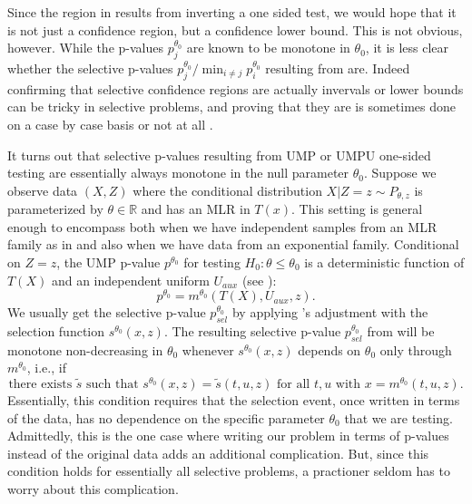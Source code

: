\documentclass{article}
\newcommand{\R}{\mathbb{R}}
\begin{document}
Since the region in  results from inverting a one sided test, we would hope that it is not just a confidence region, but a confidence lower bound. This is not obvious, however. While the p-values $p^{\theta_0}_j$ are known to be monotone in $\theta_0$, it is less clear whether the selective p-values $p^{\theta_0}_{j}/ \min_{i \neq j} p^{\theta_0}_i$ resulting from  are. Indeed confirming that selective confidence regions are actually invervals or lower bounds can be tricky in selective problems, and proving that they are is sometimes done on a case by case basis \citep{Benjamini, Lee} or not at all \citep{Sengupta}. 

It turns out that selective p-values resulting from UMP or UMPU one-sided testing are essentially always monotone in the null parameter $\theta_0$. Suppose we observe data $(X, Z)$ where the conditional distribution $X | Z= z \sim P_{\theta, z}$ is parameterized by $\theta \in \R$ and has an MLR in $T(x)$. This setting is general enough to encompass both when we have independent samples from an MLR family as in  and also when we have data from an exponential family. Conditional on $Z = z$, the UMP p-value $p^{\theta_0}$ for testing $H_0: \theta \leq \theta_0$ is a deterministic function of $T(X)$ and an independent uniform $U_{aux}$ (see ):
\begin{equation}
    p^{\theta_0} = m^{\theta_0}(T(X), U_{aux}, z).
\end{equation}
We usually get the selective p-value $p^{\theta_0}_{sel}$ by applying 's adjustment with the selection function $s^{\theta_0}(x, z)$. The resulting selective p-value $p^{\theta_0}_{sel}$ from  will be monotone non-decreasing in $\theta_0$ whenever $s^{\theta_0}(x, z)$ depends on $\theta_0$ only through $m^{\theta_0}$, i.e., if 
\begin{equation*}
   \text{there exists } \tilde{s} \text{ such that } s^{\theta_0}(x, z) = \tilde{s}(t, u, z) \text{ for all } t, u \text{ with } x = m^{\theta_0}(t, u, z).
\end{equation*}
Essentially, this condition requires that the selection event, once written in terms of the data, has no dependence on the specific parameter $\theta_0$ that we are testing. Admittedly, this is the one case where writing our problem in terms of p-values instead of the original data adds an additional complication. But, since this condition holds for essentially all selective problems, a practioner seldom has to worry about this complication.  
\end{document}
